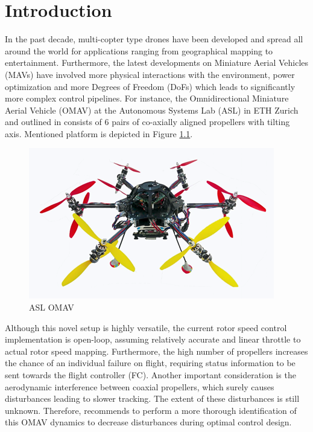 \chapter{Introduction}
\label{sec:introduction}
In the past decade, multi-copter type drones have been developed and spread all around the world for applications ranging from geographical mapping to entertainment. Furthermore, the latest developments on Miniature Aerial Vehicles (MAVs) have involved more physical interactions with the environment, power optimization and more Degrees of Freedom (DoFs) which leads to significantly more complex control pipelines. For instance, the Omnidirectional Miniature Aerial Vehicle (OMAV) at the Autonomous Systems Lab (ASL) in ETH Zurich and outlined in \cite{Bodie_Proceeding_2020} consists of 6 pairs of co-axially aligned propellers with tilting axis. Mentioned platform is depicted in Figure \ref{fig: mav_photo}.
\begin{figure}
    \centering
    \includegraphics{images/mav_photo.png}
    \caption{ASL OMAV}
    \label{fig: mav_photo}
\end{figure}

Although this novel setup is highly versatile, the current rotor speed control implementation is open-loop, assuming relatively accurate and linear throttle to actual rotor speed mapping. Furthermore, the high number of propellers increases the chance of an individual failure on flight, requiring status information to be sent towards the flight controller (FC). Another important consideration is the aerodynamic interference between coaxial propellers, which surely causes disturbances leading to slower tracking. The extent of these disturbances is still unknown. Therefore, \cite{Bodie_pre_release_2020} recommends to perform a more thorough identification of this OMAV dynamics to decrease disturbances during optimal control design.\\

